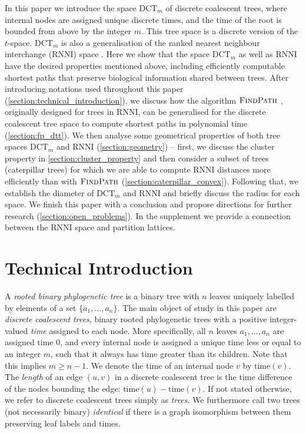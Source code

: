 \documentclass[11pt]{amsart}
\newcommand{\rnni}{\mathrm{RNNI}}
\newcommand{\findpath}{\textsc{FindPath}}
\newcommand{\ntime}{\mathrm{time}}
\newcommand{\dct}{\mathrm{DCT}}
\newcommand{\summary}[1]{} %
\begin{document}
\summary{Structure of the paper.}
In this paper we introduce the space $\dct_m$ of discrete coalescent trees, where internal nodes are assigned unique discrete times, and the time of the root is bounded from above by the integer $m$.
This tree space is a discrete version of the $t$-space.
$\dct_m$ is also a generalisation of the ranked nearest neighbour interchange ($\rnni$) space \autocite{Collienne2021}.
Here we show that the space $\dct_m$ as well as $\rnni$ have the desired properties mentioned above, including efficiently computable shortest paths that preserve biological information shared between trees.
After introducing notations used throughout this paper (\autoref{section:technical_introduction}), we discuss how the algorithm $\findpath$ \autocite{Collienne2021}, originally designed for trees in $\rnni$, can be generalised for the discrete coalescent tree space to compute shortest paths in polynomial time (\autoref{section:fp_dtt}).
We then analyse some geometrical properties of both tree spaces $\dct_m$ and $\rnni$ (\autoref{section:geometry}) -- first, we discuss the cluster property in \autoref{section:cluster_property} and then consider a subset of trees (caterpillar trees) for which we are able to compute $\rnni$ distances more efficiently than with $\findpath$ (\autoref{section:caterpillar_convex}).
Following that, we establish the diameter of $\dct_m$ and $\rnni$ and briefly discuss the radius for each space.
We finish this paper with a conclusion and propose directions for further research (\autoref{section:open_problems}).
In the supplement we provide a connection between the $\rnni$ space and partition lattices.

\section{Technical Introduction}
\label{section:technical_introduction}

\summary{Introducing discrete coalescent trees and ranked trees}
A \emph{rooted binary phylogenetic tree} is a binary tree with $n$ leaves uniquely labelled by elements of a set $\{a_1, \ldots, a_n\}$.
The main object of study in this paper are \emph{discrete coalescent trees}, binary rooted phylogenetic trees with a positive integer-valued \emph{time} assigned to each node.
More specifically, all $n$ leaves $a_1, \ldots, a_n$ are assigned time $0$, and every internal node is assigned a unique time less or equal to an integer $m$, such that it always has time greater than its children.
Note that this implies $m \geq n-1$.
We denote the time of an internal node $v$ by $\ntime(v)$.
The \emph{length} of an edge $(u,v)$ in a discrete coalescent tree is the time difference of the nodes bounding the edge: $\ntime(u) - \ntime(v)$.
If not stated otherwise, we refer to discrete coalescent trees simply as \emph{trees}.
We furthermore call two trees (not necessarily binary) \emph{identical} if there is a graph isomorphism between them preserving leaf labels and times.
\end{document}
